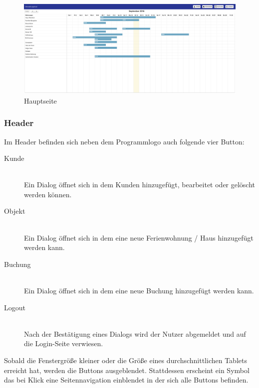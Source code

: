\begin{figure}[H]
\centering\includegraphics[width=1\textwidth]{images/frontend_mainpage.png}
\caption{Hauptseite}
\label{frontend_
mainpage}
\end{figure}

\subsubsection{Header}
Im Header befinden sich neben dem Programmlogo auch folgende vier Button:


\begin{description}
\item[Kunde]\hfill \\
Ein Dialog öffnet sich in dem Kunden hinzugefügt, bearbeitet oder gelöscht werden können.
\item[Objekt]\hfill \\ 
Ein Dialog öffnet sich in dem eine neue Ferienwohnung / Haus hinzugefügt werden kann. 
\item[Buchung]\hfill \\ 
Ein Dialog öffnet sich in dem eine neue Buchung hinzugefügt werden kann. 
\item[Logout]\hfill \\ 
Nach der Bestätigung eines Dialogs wird der Nutzer abgemeldet und auf die Login-Seite verwiesen. 
\end{description}

Sobald die Fenstergröße kleiner oder die Größe eines durchschnittlichen Tablets erreicht hat, werden die Buttons ausgeblendet. Stattdessen erscheint ein Symbol das bei Klick eine Seitennavigation einblendet in der sich alle Buttons befinden.

